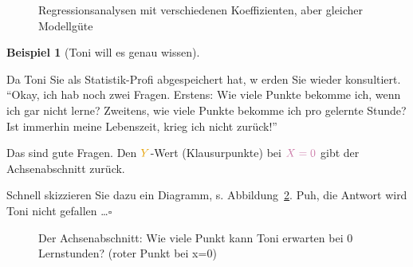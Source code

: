 \documentclass[
  a4paper,
]{scrbook}
\theoremstyle{definition}
\newtheorem{example}{Beispiel}[chapter]
\theoremstyle{definition}
\theoremstyle{definition}
\theoremstyle{remark}
\begin{document}
\begin{figure}
\begin{minipage}{0.50\linewidth}
{}


\end{minipage}%

\caption{\label{fig-regr-div}Regressionsanalysen mit verschiedenen
Koeffizienten, aber gleicher Modellgüte}

\end{figure}%

\begin{example}[Toni will es genau
wissen]\protect\hypertarget{exm-noten5}{}\label{exm-noten5}

Da Toni Sie als Statistik-Profi abgespeichert hat, w erden Sie wieder
konsultiert. ``Okay, ich hab noch zwei Fragen. Erstens: Wie viele Punkte
bekomme ich, wenn ich gar nicht lerne? Zweitens, wie viele Punkte
bekomme ich pro gelernte Stunde? Ist immerhin meine Lebenszeit, krieg
ich nicht zurück!''

{Das sind gute Fragen. Den \(\color{ycol}{Y}\)-Wert (Klausurpunkte) bei
\(\color{xcol}{X}=0\) gibt der Achsenabschnitt zurück.}

Schnell skizzieren Sie dazu ein Diagramm, s. Abbildung~\ref{fig-beta0}.
Puh, die Antwort wird Toni nicht gefallen \ldots{}\(\square\)

\end{example}

\begin{figure}


\caption{\label{fig-beta0}Der Achsenabschnitt: Wie viele Punkt kann Toni
erwarten bei 0 Lernstunden? (roter Punkt bei x=0)}

\end{figure}%
\end{document}
